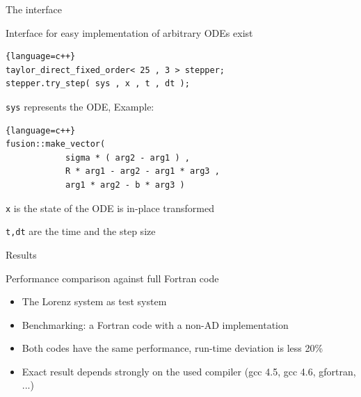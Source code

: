 \documentclass{beamer}
\begin{document}
\begin{frame}[fragile]{The interface}

Interface for easy implementation of arbitrary ODEs exist
\begin{lstlisting}{language=c++}
taylor_direct_fixed_order< 25 , 3 > stepper;
stepper.try_step( sys , x , t , dt );
\end{lstlisting}

\vspace{1ex}
{\tt sys} represents the ODE, Example:
\begin{lstlisting}{language=c++}
fusion::make_vector(
            sigma * ( arg2 - arg1 ) ,
            R * arg1 - arg2 - arg1 * arg3 ,
            arg1 * arg2 - b * arg3 )
 \end{lstlisting}


\vspace{1ex}
{\tt x} is the state of the ODE is in-place transformed

\vspace{1ex}
{\tt t,dt} are the time and the step size

\end{frame}





\begin{frame}[fragile]{Results}

Performance comparison against full Fortran code

\begin{itemize}
 \item The Lorenz system as test system
 \item Benchmarking: a Fortran code with a non-AD implementation
 \item Both codes have the same performance, run-time deviation is less 20\%
 \item Exact result depends strongly on the used compiler (gcc 4.5, gcc 4.6, gfortran, ...)
\end{itemize}

\end{frame}
\end{document}
